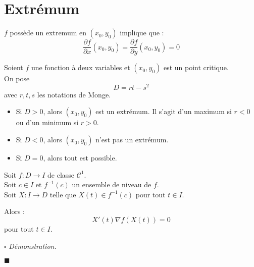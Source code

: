 \documentclass[a4paper, titlepage]{article}
\renewenvironment{proof}{$\square$ \footnotesize\textit{Démonstration.}}{\begin{flushright}$\blacksquare$\end{flushright}}
\begin{document}
	\section{Extrémum}
	\begin{thm}
		$f$ possède un extremum en $(x_0,y_0)$ implique que :
		$$ \frac{\partial f}{\partial x}(x_0,y_0) = \frac{\partial f}{\partial y}(x_0,y_0) = 0$$
	\end{thm}
	\begin{thm}
		Soient $f$ une fonction à deux variables et $(x_0,y_0)$ est un point critique. \\
		On pose $$ D = rt-s^2$$
		avec $r,t,s$ les notations de Monge.

		\begin{itemize}
			\item Si $D>0$, alors $(x_0,y_0)$ est un extrémum. Il s'agit d'un maximum si $r<0$ ou d'un minimum si $r>0$.
			\item Si $D<0$, alors $(x_0,y_0)$ n'est pas un extrémum.
			\item Si $D=0$, alors tout est possible.
		\end{itemize}
	\end{thm}
	\begin{props}
		Soit $f:D\to I$ de classe $\mathcal{C}^1$. \\
		Soit $c\in I$ et $f^{-1}(c)$ un ensemble de niveau de $f$.\\
		Soit $X: I\to D$ telle que $X(t)\in f^{-1}(c)$ pour tout $t\in I$.

		Alors :
		$$ X'(t)\nabla f(X(t)) = 0 $$
		pour tout $t\in I$.
	\end{props}
	\begin{proof}
		\AQT
	\end{proof}
\end{document}
